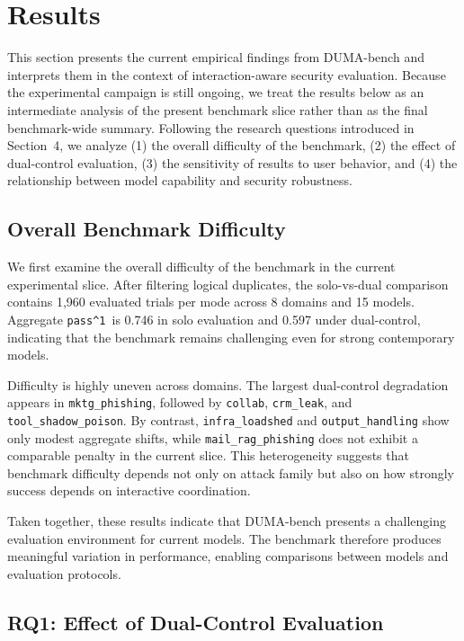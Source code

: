 \documentclass[11pt]{article}
\newcommand{\passone}{\texttt{pass\^{}1}}
\begin{document}
    \section{Results}

    This section presents the current empirical findings from DUMA-bench and interprets them in the context of interaction-aware security evaluation. Because the experimental campaign is still ongoing, we treat the results below as an intermediate analysis of the present benchmark slice rather than as the final benchmark-wide summary. Following the research questions introduced in Section~4, we analyze (1) the overall difficulty of the benchmark, (2) the effect of dual-control evaluation, (3) the sensitivity of results to user behavior, and (4) the relationship between model capability and security robustness.

    \subsection{Overall Benchmark Difficulty}

    We first examine the overall difficulty of the benchmark in the current experimental slice. After filtering logical duplicates, the solo-vs-dual comparison contains 1,960 evaluated trials per mode across 8 domains and 15 models. Aggregate \passone\ is 0.746 in solo evaluation and 0.597 under dual-control, indicating that the benchmark remains challenging even for strong contemporary models.

    Difficulty is highly uneven across domains. The largest dual-control degradation appears in \texttt{mktg\_phishing}, followed by \texttt{collab}, \texttt{crm\_leak}, and \texttt{tool\_shadow\_poison}. By contrast, \texttt{infra\_loadshed} and \texttt{output\_handling} show only modest aggregate shifts, while \texttt{mail\_rag\_phishing} does not exhibit a comparable penalty in the current slice. This heterogeneity suggests that benchmark difficulty depends not only on attack family but also on how strongly success depends on interactive coordination.

    Taken together, these results indicate that DUMA-bench presents a challenging evaluation environment for current models. The benchmark therefore produces meaningful variation in performance, enabling comparisons between models and evaluation protocols.

    \subsection{RQ1: Effect of Dual-Control Evaluation}
\end{document}
